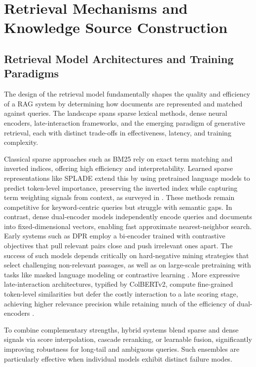 \documentclass[11pt,a4paper]{article}
\begin{document}
\section{Retrieval Mechanisms and Knowledge Source Construction}



\subsection{Retrieval Model Architectures and Training Paradigms}


The design of the retrieval model fundamentally shapes the quality and efficiency of a RAG system by determining how documents are represented and matched against queries. The landscape spans sparse lexical methods, dense neural encoders, late-interaction frameworks, and the emerging paradigm of generative retrieval, each with distinct trade-offs in effectiveness, latency, and training complexity.

Classical sparse approaches such as BM25 rely on exact term matching and inverted indices, offering high efficiency and interpretability. Learned sparse representations like SPLADE extend this by using pretrained language models to predict token-level importance, preserving the inverted index while capturing term weighting signals from context, as surveyed in \cite{arxiv:2211.14876v1}. These methods remain competitive for keyword-centric queries but struggle with semantic gaps. In contrast, dense dual-encoder models independently encode queries and documents into fixed-dimensional vectors, enabling fast approximate nearest-neighbor search. Early systems such as DPR \cite{arxiv:2211.14876v1} employ a bi-encoder trained with contrastive objectives that pull relevant pairs close and push irrelevant ones apart. The success of such models depends critically on hard-negative mining strategies that select challenging non-relevant passages, as well as on large-scale pretraining with tasks like masked language modeling or contrastive learning \cite{arxiv:2211.14876v1}. More expressive late-interaction architectures, typified by ColBERTv2, compute fine-grained token-level similarities but defer the costly interaction to a late scoring stage, achieving higher relevance precision while retaining much of the efficiency of dual-encoders \cite{arxiv:2211.14876v1}.

To combine complementary strengths, hybrid systems blend sparse and dense signals via score interpolation, cascade reranking, or learnable fusion, significantly improving robustness for long-tail and ambiguous queries. Such ensembles are particularly effective when individual models exhibit distinct failure modes.
\end{document}
